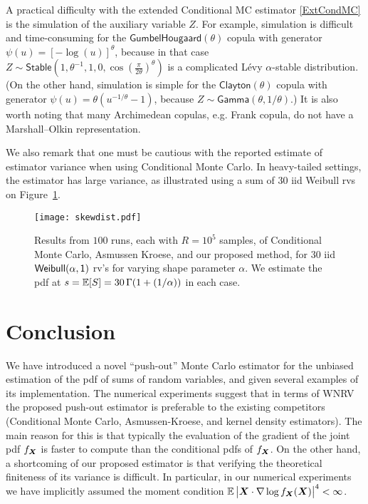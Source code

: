 A practical difficulty with the extended Conditional MC estimator \eqref{ExtCondMC} is the simulation of the auxiliary variable $Z$.
For example, simulation is difficult and time-consuming for the $\mathsf{GumbelHougaard}(\theta)$ copula with generator $\psi(u) = [-\log( u )]^\theta$, because in that case  $Z \sim \mathsf{Stable}(1, \theta^{-1}, 1, 0, \cos(\frac{\pi}{2 \theta})^\theta)$ is a complicated L\'evy $\alpha$-stable distribution. (On the other hand, simulation is simple for the $\mathsf{Clayton}(\theta)$ copula with generator $\psi(u) = \theta (u^{-1/\theta} - 1)$, because  $Z \sim \mathsf{Gamma}(\theta, 1/\theta)$.) It is also worth noting that many Archimedean copulas, e.g. Frank copula, do not have a Marshall--Olkin representation.

We also remark that one must be cautious with the reported estimate of estimator variance when using Conditional Monte Carlo. In heavy-tailed settings, the estimator has large variance, as illustrated using a sum of 30 iid Weibull rvs on Figure~\ref{fig:weibull}.



 \begin{figure}[htb]
    \centering 
    \texttt{[image: skewdist.pdf]}
    \caption{Results from $100$ runs, each with $R=10^5$ samples, of Conditional Monte Carlo, Asmussen Kroese, and our proposed method, for 30 iid $\sf{Weibull}(\alpha,1)$ rv's for varying shape parameter $\alpha$. We estimate the pdf at $s = \mathbb{E}[S] = 30 \,\Gamma(1+(1/\alpha))$ in each case.}

		\label{fig:weibull}
\end{figure} 


\section{Conclusion} \label{sec:Conclusion}
We have introduced a novel ``push-out'' Monte Carlo estimator for the unbiased estimation of the pdf of sums of random variables, and given several examples of its implementation.  The numerical experiments suggest that in terms of WNRV the proposed push-out estimator is preferable to the existing competitors (Conditional Monte Carlo, Asmussen-Kroese, and kernel density estimators). The main reason for this is that typically the evaluation of the gradient of the joint pdf 
$f_{\boldsymbol{X}}$ is faster to compute than the conditional pdfs of $f_{\boldsymbol{X}}$.
On the other hand, a shortcoming of our proposed estimator is that verifying the theoretical finiteness of its variance is difficult. In particular, in our numerical experiments we have implicitly assumed the moment condition $\operatorname{{\mathbb E}} \big| \boldsymbol{X} \cdot \nabla \log f_{\boldsymbol{X}}(\boldsymbol{X})\big|^4<\infty$.

